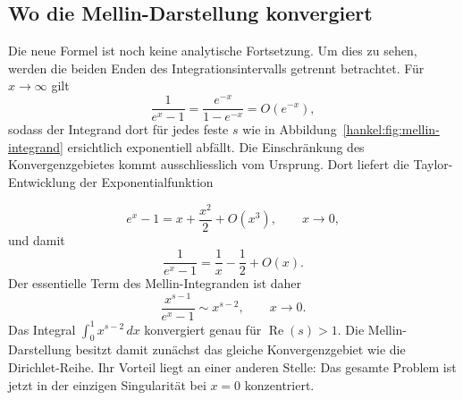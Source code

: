 \subsection{Wo die Mellin-Darstellung konvergiert}

Die neue Formel ist noch keine analytische Fortsetzung. 
Um dies zu sehen, werden die beiden Enden des Integrationsintervalls getrennt betrachtet. 
Für $x\to\infty$ gilt
\begin{equation}
\frac{1}{e^x-1}
=
\frac{e^{-x}}{1-e^{-x}}
=
O(e^{-x}),
\label{hankel:eq:unendlich-mellin}
\end{equation}
sodass der Integrand dort für jedes feste $s$ wie in Abbildung~\ref*{hankel:fig:mellin-integrand} ersichtlich exponentiell abfällt. 
Die Einschränkung des Konvergenzgebietes kommt ausschliesslich vom Ursprung.
Dort liefert die Taylor-Entwicklung der Exponentialfunktion

\begin{equation}
e^x-1
=
x+\frac{x^2}{2}+O(x^3),
\qquad x\to0,
\label{hankel:eq:exp-taylor-null}
\end{equation}
und damit
\begin{equation}
\frac{1}{e^x-1}
=
\frac{1}{x}
-
\frac{1}{2}
+
O(x).
\label{hankel:eq:bernoulli-anfang}
\end{equation}
Der essentielle Term des Mellin-Integranden ist daher
\begin{equation}
\frac{x^{s-1}}{e^x-1}
\sim
x^{s-2},
\qquad x\to0.
\label{hankel:eq:mellin-asymptotik-null}
\end{equation}
Das Integral $\int_0^1x^{s-2}\,dx$ konvergiert genau für
$\operatorname{Re}(s)>1$. 
Die Mellin-Darstellung besitzt damit zunächst das gleiche Konvergenzgebiet wie die Dirichlet-Reihe. 
Ihr Vorteil liegt an einer anderen Stelle: Das gesamte Problem ist jetzt in der einzigen Singularität
bei $x=0$ konzentriert.

